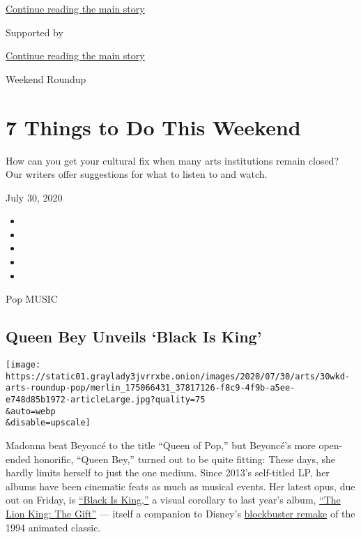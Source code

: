 \protect\hyperlink{after-top}{Continue reading the main story}

Supported by

\protect\hyperlink{after-sponsor}{Continue reading the main story}

Weekend Roundup

\hypertarget{7-things-to-do-this-weekend}{%
\section{7 Things to Do This
Weekend}\label{7-things-to-do-this-weekend}}

How can you get your cultural fix when many arts institutions remain
closed? Our writers offer suggestions for what to listen to and watch.

July 30, 2020

\begin{itemize}
\item
\item
\item
\item
\item
\end{itemize}

Pop MUSIC

\hypertarget{queen-bey-unveils-black-is-king}{%
\subsection{Queen Bey Unveils `Black Is
King'}\label{queen-bey-unveils-black-is-king}}

\texttt{[image: https://static01.graylady3jvrrxbe.onion/images/2020/07/30/arts/30wkd-arts-roundup-pop/merlin\_175066431\_37817126-f8c9-4f9b-a5ee-e748d85b1972-articleLarge.jpg?quality=75\\\&auto=webp\\\&disable=upscale]}

Madonna beat Beyoncé to the title ``Queen of Pop,'' but Beyoncé's more
open-ended honorific, ``Queen Bey,'' turned out to be quite fitting:
These days, she hardly limits herself to just the one medium. Since
2013's self-titled LP, her albums have been cinematic feats as much as
musical events. Her latest opus, due out on Friday, is
\href{https://disneyplusoriginals.disney.com/movie/black-is-king}{``Black
Is King,''} a visual corollary to last year's album,
\href{https://www.youtube.com/watch?v=XnDdyeOaXy0\&list=OLAK5uy_nkj8U4dj1uSMUhZsAp0R3TpYH0xWvbcPc}{``The
Lion King: The Gift''} --- itself a companion to Disney's
\href{https://www.nytimes3xbfgragh.onion/2019/07/11/movies/the-lion-king-review.html}{blockbuster
remake} of the 1994 animated classic.

